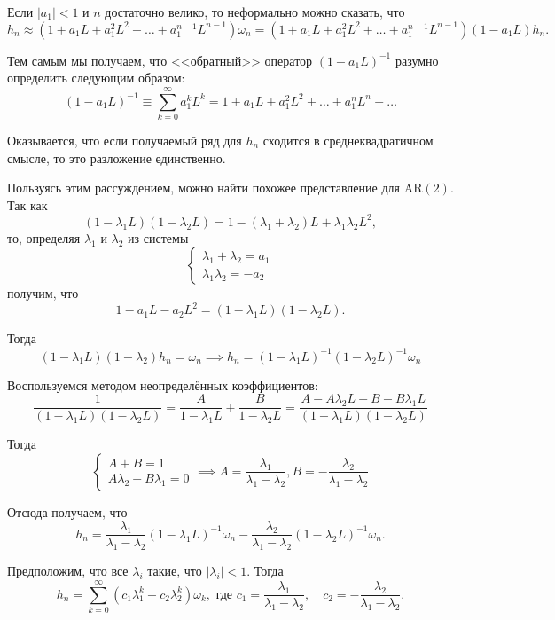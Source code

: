 Если \(|a_{1}| < 1\) и \(n\) достаточно велико, то неформально можно сказать, 
что
\[
	h_{n} \approx (1 + a_{1}L + a_{1}^{2}L^{2} + \ldots + a_{1}^{n - 1}L^{n - 
	1})\omega_{n} = (1 + a_{1}L + a_{1}^{2}L^{2} + \ldots + a_{1}^{n - 1}L^{n - 
	1})(1 - a_{1}L)h_{n}.
\]

Тем самым мы получаем, что <<обратный>> оператор \((1 - a_{1}L)^{-1}\) разумно 
определить следующим образом:
\[
	(1 - a_{1}L)^{-1} \equiv \sum_{k = 0}^{\infty} a_{1}^{k}L^{k} = 1 + a_{1}L 
	+ a_{1}^{2}L^{2} + \ldots + a_{1}^{n}L^{n} + \ldots
\]

Оказывается, что если получаемый ряд для \(h_{n}\) сходится в 
среднеквадратичном смысле, то это разложение единственно.

Пользуясь этим рассуждением, можно найти похожее представление для 
\(\mathrm{AR}(2)\). Так как
\[
	(1 - \lambda_{1}L)(1 - \lambda_{2}L) = 1 - (\lambda_{1} + \lambda_{2})L + 
	\lambda_{1}\lambda_{2}L^{2},
\]
то, определяя \(\lambda_{1}\) и \(\lambda_{2}\) из системы
\[
	\begin{cases}
	\lambda_{1} + \lambda_{2} = a_{1} \\
	\lambda_{1}\lambda_{2} = -a_{2}
	\end{cases}
\]
получим, что
\[
	1 - a_{1}L - a_{2}L^{2} = (1 - \lambda_{1}L)(1 - \lambda_{2}L).
\]

Тогда
\[
	(1 - \lambda_{1}L)(1 - \lambda_{2})h_{n} = \omega_{n} \implies h_{n} = (1 - 
	\lambda_{1}L)^{-1}(1 - \lambda_{2}L)^{-1}\omega_{n}
\]

Воспользуемся методом неопределённых коэффициентов:
\[
	\frac{1}{(1 - \lambda_{1}L)(1 - \lambda_{2}L)} = \frac{A}{1 - \lambda_{1}L} 
	+ \frac{B}{1 - \lambda_{2}L} = \frac{A - A\lambda_{2}L + B - 
	B\lambda_{1}L}{(1 - \lambda_{1}L)(1 - \lambda_{2}L)}
\]

Тогда
\[
	\begin{cases}
	A + B = 1 \\
	A\lambda_{2} + B\lambda_{1} = 0
	\end{cases}
	\implies
	A = \frac{\lambda_{1}}{\lambda_{1} - \lambda_{2}}, B = 
	-\frac{\lambda_{2}}{\lambda_{1} - \lambda_{2}}
\]

Отсюда получаем, что
\[
	h_{n} = \frac{\lambda_{1}}{\lambda_{1} - \lambda_{2}}(1 - 
	\lambda_{1}L)^{-1}\omega_{n} - \frac{\lambda_{2}}{\lambda_{1} - 
	\lambda_{2}}(1 - \lambda_{2}L)^{-1}\omega_{n}.
\]

Предположим, что все \(\lambda_{i}\) такие, что \(|\lambda_{i}| < 1\). Тогда 
\[
	h_{n} = \sum_{k = 0}^{\infty} (c_{1}\lambda_{1}^{k} + 
	c_{2}\lambda_{2}^{k})\omega_{k}, \text{ где } c_{1} = 
	\frac{\lambda_{1}}{\lambda_{1} - \lambda_{2}}, \quad c_{2} = 
	-\frac{\lambda_{2}}{\lambda_{1} - \lambda_{2}}.
\]

